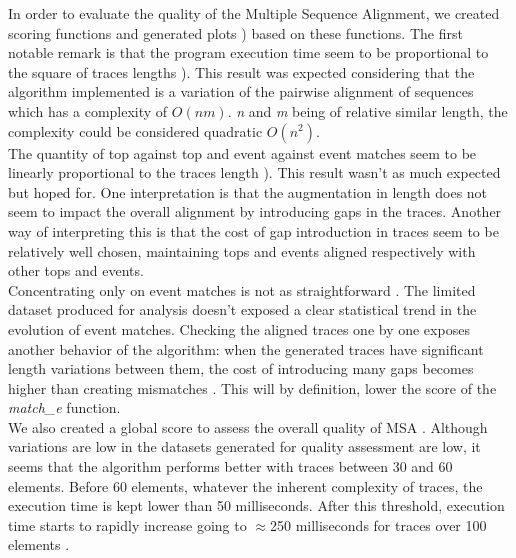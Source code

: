 \documentclass[12pt,a4paper]{article}
\begin{document}
In order to evaluate the quality of the Multiple Sequence Alignment, we created scoring functions and generated plots {)} based on these functions.
The first notable remark is that the program execution time seem to be proportional to the square of traces lengths {)}.
This result was expected considering that the algorithm implemented is a variation of the pairwise alignment of sequences which has a complexity of $O(nm)$.
\emph{n} and \emph{m} being of relative similar length, the complexity could be considered quadratic $O(n^2)$.\\

The quantity of top against top and event against event matches seem to be linearly proportional to the traces length {)}.
This result wasn't as much expected but hoped for.
One interpretation is that the augmentation in length does not seem to impact the overall alignment by introducing gaps in the traces.
Another way of interpreting this is that the cost of gap introduction in traces seem to be relatively well chosen, maintaining tops and events aligned respectively with other tops and events.\\

Concentrating only on event matches is not as straightforward {}.
The limited dataset produced for analysis doesn't exposed a clear statistical trend in the evolution of event matches.
Checking the aligned traces one by one exposes another behavior of the algorithm:
when the generated traces have significant length variations between them, the cost of introducing many gaps becomes higher than creating mismatches {}.
This will by definition, lower the score of the \emph{match\_e} function.\\

We also created a global score to assess the overall quality of MSA {}.
Although variations are low in the datasets generated for quality assessment are low, it seems that the algorithm performs better with traces between 30 and 60 elements.
Before 60 elements, whatever the inherent complexity of traces, the execution time is kept lower than 50 milliseconds.
After this threshold, execution time starts to rapidly increase going to $\approx$250 milliseconds for traces over 100 elements {}. 
\end{document}
